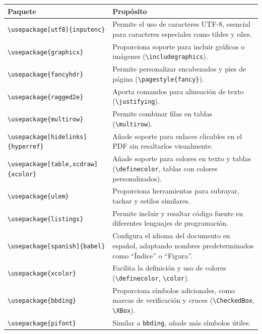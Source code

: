 \documentclass{article}
\begin{document}
\begin{flushleft}
\begin{longtable}{|p{}|p{}|}
\hline
\textbf{Paquete} & \textbf{Propósito} \\ \hline
\texttt{\textbackslash usepackage[utf8]\{inputenc\}} & Permite el uso de caracteres UTF-8, esencial para caracteres especiales como tildes y eñes. \\ \hline
\texttt{\textbackslash usepackage\{graphicx\}} & Proporciona soporte para incluir gráficos o imágenes (\texttt{\textbackslash includegraphics}). \\ \hline
\texttt{\textbackslash usepackage\{fancyhdr\}} & Permite personalizar encabezados y pies de página (\texttt{\textbackslash pagestyle\{fancy\}}). \\ \hline
\texttt{\textbackslash usepackage\{ragged2e\}} & Aporta comandos para alineación de texto (\texttt{\textbackslash justifying}). \\ \hline
\texttt{\textbackslash usepackage\{multirow\}} & Permite combinar filas en tablas (\texttt{\textbackslash multirow}). \\ \hline
\texttt{\textbackslash usepackage[hidelinks]\{hyperref\}} & Añade soporte para enlaces clicables en el PDF sin resaltarlos visualmente. \\ \hline
\texttt{\textbackslash usepackage[table,xcdraw]\{xcolor\}} & Añade soporte para colores en texto y tablas (\texttt{\textbackslash definecolor}, tablas con colores personalizados). \\ \hline
\texttt{\textbackslash usepackage\{ulem\}} & Proporciona herramientas para subrayar, tachar y estilos similares. \\ \hline
\texttt{\textbackslash usepackage\{listings\}} & Permite incluir y resaltar código fuente en diferentes lenguajes de programación. \\ \hline
\texttt{\textbackslash usepackage[spanish]\{babel\}} & Configura el idioma del documento en español, adaptando nombres predeterminados como ``Índice'' o ``Figura''. \\ \hline
\texttt{\textbackslash usepackage\{xcolor\}} & Facilita la definición y uso de colores (\texttt{\textbackslash definecolor}, \texttt{\textbackslash color}). \\ \hline
\texttt{\textbackslash usepackage\{bbding\}} & Proporciona símbolos adicionales, como marcas de verificación y cruces (\texttt{\textbackslash CheckedBox}, \texttt{\textbackslash XBox}). \\ \hline
\texttt{\textbackslash usepackage\{pifont\}} & Similar a \texttt{bbding}, añade más símbolos útiles. \\ \hline

\end{longtable}
\end{flushleft}
\end{document}
